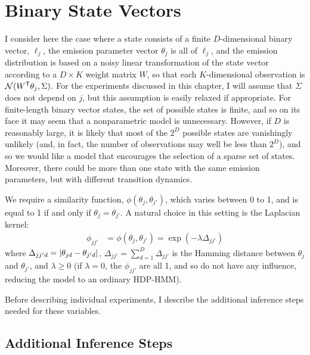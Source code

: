 \section{Binary State Vectors}

I consider here the case where a state consists of a finite $D$-dimensional 
binary vector, $\ell_j$, the emission parameter vector $\theta_j$ is all of $\ell_j$, and the emission distribution is based on a noisy linear transformation of the state vector according to a $D \times K$ weight matrix $W$, so that each $K$-dimensional
observation is $\mathcal{N}(W^{\sf T} \theta_j,\Sigma)$.  For the experiments discussed
in this chapter, I will assume that $\Sigma$ does not depend on $j$, but this assumption
is easily relaxed if appropriate.  For finite-length binary vector
states, the set of possible states is finite, and so on its face it may
seem that a nonparametric model is unnecessary.  However, if $D$ is
reasonably large, it is likely that most of the $2^D$ possible states
are vanishingly unlikely (and, in fact, the number of observations may
well be less than $2^D$), and so we would like a model that encourages
the selection of a sparse set of states.  Moreover, there could be more
than one state with the same emission parameters, but with different transition
dynamics. 

We require a similarity function, $\phi(\theta_j, \theta_{j'})$, which 
varies between 0 to 1, and is equal to 1 if and only if $\theta_j =
\theta_{j'}$.  A natural choice in this setting is the Laplacian kernel:
\begin{align}
  \label{eq:39}
  \phi_{jj'} &= \phi(\theta_j, \theta_{j'}) = \exp(-\lambda \Delta_{jj'})
\end{align}
where $\Delta_{jj'd} = \left\vert \theta_{jd} - \theta_{j'd} \right\vert$, $\Delta_{jj'} =
\sum_{d=1}^D \Delta_{jj'}$ is the Hamming
distance between $\theta_j$ and $\theta_{j'}$,
and $\lambda \geq 0$ (if $\lambda = 0$, the $\phi_{jj'}$
are all 1, and so do not have any influence, reducing the
model to an ordinary HDP-HMM).

Before describing individual experiments, I describe the additional
inference steps needed for these variables.

\subsection{Additional Inference Steps}
\label{sec:sampling-eta}

